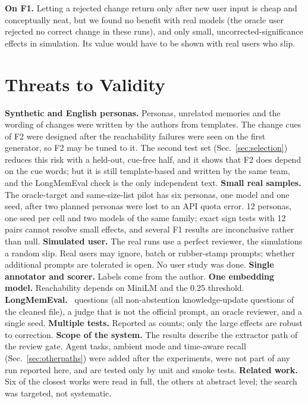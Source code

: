 \IfFileExists{IEEEtran.cls}{\documentclass[journal]{IEEEtran}\def\HAVEIEEE{1}}{\documentclass[10pt,twocolumn]{article}\usepackage[margin=0.7in,columnsep=0.25in]{geometry}}
\begin{document}
\textbf{On F1.} Letting a rejected change return only after new user input is cheap and conceptually neat, but we found no benefit with real models (the oracle user rejected no correct change in these runs), and only small, uncorrected-significance effects in simulation. Its value would have to be shown with real users who slip.

\section{Threats to Validity}
\label{sec:threats}
\textbf{Synthetic and English personas.} Personas, unrelated memories and the wording of changes were written by the authors from templates. The change cues of F2 were designed after the reachability failures were seen on the first generator, so F2 may be tuned to it. The second test set (Sec.~\ref{sec:selection}) reduces this risk with a held-out, cue-free half, and it shows that F2 does depend on the cue words; but it is still template-based and written by the same team, and the LongMemEval check is the only independent text. \textbf{Small real samples.} The oracle-target and same-size-list pilot has six personas, one model and one seed, after two planned personas were lost to an API quota error. 12 personas, one seed per cell and two models of the same family; exact sign tests with 12 pairs cannot resolve small effects, and several F1 results are inconclusive rather than null. \textbf{Simulated user.} The real runs use a perfect reviewer, the simulations a random slip. Real users may ignore, batch or rubber-stamp prompts; whether additional prompts are tolerated is open. No user study was done. \textbf{Single annotator and scorer.} Labels come from the author. \textbf{One embedding model.} Reachability depends on MiniLM and the 0.25 threshold. \textbf{LongMemEval.} \lmeQ\ questions (all non-abstention knowledge-update questions of the cleaned file), a judge that is not the official prompt, an oracle reviewer, and a single seed. \textbf{Multiple tests.} Reported as counts; only the large effects are robust to correction. \textbf{Scope of the system.} The results describe the extractor path of the review gate. Agent tasks, ambient mode and time-aware recall (Sec.~\ref{sec:otherpaths}) were added after the experiments, were not part of any run reported here, and are tested only by unit and smoke tests. \textbf{Related work.} Six of the closest works were read in full, the others at abstract level; the search was targeted, not systematic.
\end{document}
